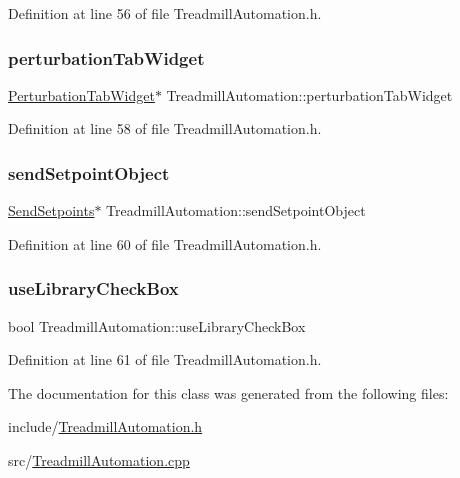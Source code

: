Definition at line 56 of file Treadmill\+Automation.\+h.

\mbox{\label{class_treadmill_automation_a15ff3f7caee7351e6c00d7068fac6eeb}} 
\subsubsection{\texorpdfstring{perturbation\+Tab\+Widget}{perturbationTabWidget}}
{\footnotesize\ttfamily \hyperlink{class_perturbation_tab_widget}{Perturbation\+Tab\+Widget}$\ast$ Treadmill\+Automation\+::perturbation\+Tab\+Widget}



Definition at line 58 of file Treadmill\+Automation.\+h.

\mbox{\label{class_treadmill_automation_af69da20288496d350a77e33c71cb2264}} 
\subsubsection{\texorpdfstring{send\+Setpoint\+Object}{sendSetpointObject}}
{\footnotesize\ttfamily \hyperlink{class_send_setpoints}{Send\+Setpoints}$\ast$ Treadmill\+Automation\+::send\+Setpoint\+Object}



Definition at line 60 of file Treadmill\+Automation.\+h.

\mbox{\label{class_treadmill_automation_aaac53081494b8726c64f9355fe7e666b}} 
\subsubsection{\texorpdfstring{use\+Library\+Check\+Box}{useLibraryCheckBox}}
{\footnotesize\ttfamily bool Treadmill\+Automation\+::use\+Library\+Check\+Box}



Definition at line 61 of file Treadmill\+Automation.\+h.



The documentation for this class was generated from the following files\+:\begin{DoxyCompactItemize}
\item 
include/\hyperlink{_treadmill_automation_8h}{Treadmill\+Automation.\+h}\item 
src/\hyperlink{_treadmill_automation_8cpp}{Treadmill\+Automation.\+cpp}\end{DoxyCompactItemize}
